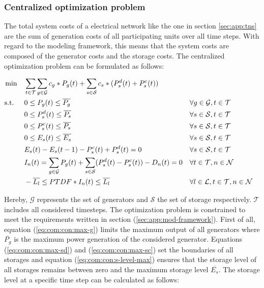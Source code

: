 \subsubsection{Centralized optimization problem}

The total system costs of a electrical network like the one in section \ref{sec:app:tns} are the sum of generation costs of all participating units over all time steps. With regard to the modeling framework, this means that the system costs are composed of the generator costs and the storage costs. The centralized optimization problem can be formulated as follows:

\begin{subequations}
	\begin{align}
		 \min \quad & \sum_{t\in\mathcal{T}}\sum_{g\in\mathcal{G}}c_g*P_g(t) + \sum_{s\in\mathcal{S}}c_s*(P_s^d(t)+P_s^c(t))\\
		 \text{s.t. } \quad & 0 \leq P_g(t) \leq \overline{P_g} && \forall g \in \mathcal{G}, t \in \mathcal{T} \label{eq:com:con:max-g}\\
		 & 0 \leq P_s^d(t) \leq \overline{P_s} && \forall s \in \mathcal{S}, t \in \mathcal{T} \label{eq:com:con:max-sd}\\
		 & 0 \leq P_s^c(t) \leq \overline{P_s} && \forall s \in \mathcal{S}, t \in \mathcal{T} \label{eq:com:con:max-sc}\\
		 & 0 \leq E_s(t) \leq \overline{E_s} && \forall s \in \mathcal{S}, t \in \mathcal{T} \label{eq:com:con:s-level-max}\\
		 & E_s(t) - E_s(t-1) - P_s^c(t) + P_s^d(t) = 0 && \forall s \in \mathcal{S}, t \in \mathcal{T} \label{eq:com:con:s-level}\\
		 & I_n(t) = \sum_{g\in\mathcal{G}}P_g(t) + \sum_{s\in\mathcal{S}}(P_s^d(t)-P_s^c(t))-D_n(t) = 0 && \forall t \in \mathcal{T}, n \in \mathcal{N} \label{eq:com:con:eb}\\
		 & -\overline{L_l} \leq PTDF * I_n(t) \leq \overline{L_l} && \forall l \in \mathcal{L}, t \in \mathcal{T}, n \in \mathcal{N} \label{eq:com:con:pf}
	\end{align}
\end{subequations}

Hereby, $\mathcal{G}$ represents the set of generators and $\mathcal{S}$ the set of storage respectively. $\mathcal{T}$ includes all considered timesteps. The optimization problem is constrained to meet the requirements written in section (\ref{sec:app:mod-framework}). First of all, equation (\ref{eq:com:con:max-g}) limits the maximum output of all generators where $\overline{P_g}$ is the maximum power generation of the considered generator. Equations (\ref{eq:com:con:max-sd}) and (\ref{eq:com:con:max-sc}) set the boundaries of all storages and equation (\ref{eq:com:con:s-level-max}) ensures that the storage level of all storages remains between zero and the maximum storage level $\overline{E_s}$. The storage level at a specific time step can be calculated as follows:


